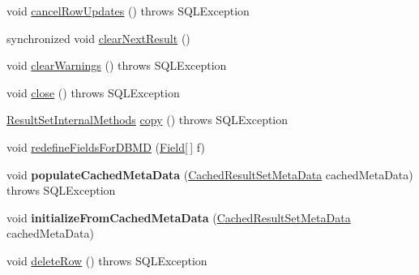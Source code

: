 \begin{DoxyCompactItemize}
\item 
void \mbox{\hyperlink{classcom_1_1mysql_1_1jdbc_1_1_result_set_impl_ae69d7d33c47f94fbe7f7c0bd38319dcd}{cancel\+Row\+Updates}} ()  throws S\+Q\+L\+Exception 
\item 
synchronized void \mbox{\hyperlink{classcom_1_1mysql_1_1jdbc_1_1_result_set_impl_a1e36a4b0bf39b90b06dea75eb4d8c66e}{clear\+Next\+Result}} ()
\item 
void \mbox{\hyperlink{classcom_1_1mysql_1_1jdbc_1_1_result_set_impl_aa7004e3cd1cfb057fb2b7e3a14802c54}{clear\+Warnings}} ()  throws S\+Q\+L\+Exception 
\item 
void \mbox{\hyperlink{classcom_1_1mysql_1_1jdbc_1_1_result_set_impl_a08b7641e8a768554093538fc9c0a4143}{close}} ()  throws S\+Q\+L\+Exception 
\item 
\mbox{\hyperlink{interfacecom_1_1mysql_1_1jdbc_1_1_result_set_internal_methods}{Result\+Set\+Internal\+Methods}} \mbox{\hyperlink{classcom_1_1mysql_1_1jdbc_1_1_result_set_impl_a4f2a8d2b18832126779e992109371a59}{copy}} ()  throws S\+Q\+L\+Exception 
\item 
void \mbox{\hyperlink{classcom_1_1mysql_1_1jdbc_1_1_result_set_impl_a4fba1e8958a474ee74b88f2356c01d19}{redefine\+Fields\+For\+D\+B\+MD}} (\mbox{\hyperlink{classcom_1_1mysql_1_1jdbc_1_1_field}{Field}}\mbox{[}$\,$\mbox{]} f)
\item 
\mbox{\label{classcom_1_1mysql_1_1jdbc_1_1_result_set_impl_a755ed97292bb83e6ba4aa2c48d3c3c59}} 
void {\bfseries populate\+Cached\+Meta\+Data} (\mbox{\hyperlink{classcom_1_1mysql_1_1jdbc_1_1_cached_result_set_meta_data}{Cached\+Result\+Set\+Meta\+Data}} cached\+Meta\+Data)  throws S\+Q\+L\+Exception 
\item 
\mbox{\label{classcom_1_1mysql_1_1jdbc_1_1_result_set_impl_ae39ededd7edfd029ebe4261e25bded07}} 
void {\bfseries initialize\+From\+Cached\+Meta\+Data} (\mbox{\hyperlink{classcom_1_1mysql_1_1jdbc_1_1_cached_result_set_meta_data}{Cached\+Result\+Set\+Meta\+Data}} cached\+Meta\+Data)
\item 
void \mbox{\hyperlink{classcom_1_1mysql_1_1jdbc_1_1_result_set_impl_af928ac0eb3a309fb2bf6c31d86cc2b32}{delete\+Row}} ()  throws S\+Q\+L\+Exception 
\item 
\mbox{\label{classcom_1_1mysql_1_1jdbc_1_1_result_set_impl_a8aa10c648da52f6a7c9b9bd54ce87aba}} 

\end{DoxyCompactItemize}
